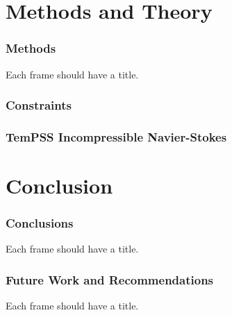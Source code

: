 \documentclass{beamer}
\begin{document}
\section{Methods and Theory}
\begin{frame}\frametitle{Methods} 
Each frame should have a title.
\end{frame}

\begin{frame}\frametitle{Constraints} 
\href{http://localhost:8081/nek_dep.html}{}
\end{frame}

\begin{frame}\frametitle{TemPSS Incompressible Navier-Stokes} 
\href{http://localhost:8081/nek_dep.html}{}
\end{frame}

\section{Conclusion}
\begin{frame}\frametitle{Conclusions} 
Each frame should have a title.
\end{frame}

\begin{frame}\frametitle{Future Work and Recommendations} 
Each frame should have a title.
\end{frame}
\end{document}
